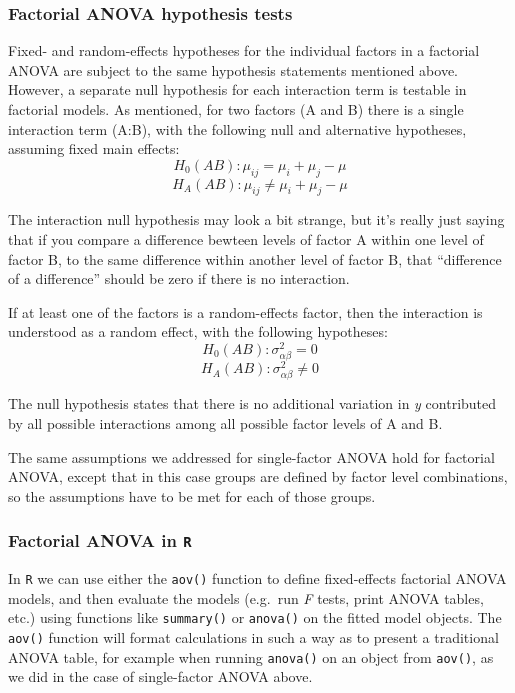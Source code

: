 \documentclass[]{book}
\begin{document}
\hypertarget{factorial-anova-hypothesis-tests}{%
\subsubsection{Factorial ANOVA hypothesis tests}\label{factorial-anova-hypothesis-tests}}

Fixed- and random-effects hypotheses for the individual factors in a factorial ANOVA are subject to the same hypothesis statements mentioned above. However, a separate null hypothesis for each interaction term is testable in factorial models. As mentioned, for two factors (A and B) there is a single interaction term (A:B), with the following null and alternative hypotheses, assuming fixed main effects:
\[H_0(AB):\mu_{ij}=\mu_i+\mu_j-\mu\]
\[H_A(AB):\mu_{ij}\neq\mu_i+\mu_j-\mu\]

The interaction null hypothesis may look a bit strange, but it's really just saying that if you compare a difference bewteen levels of factor A within one level of factor B, to the same difference within another level of factor B, that ``difference of a difference'' should be zero if there is no interaction.

If at least one of the factors is a random-effects factor, then the interaction is understood as a random effect, with the following hypotheses:
\[H_0(AB):\sigma_{\alpha\beta}^2=0\]
\[H_A(AB):\sigma_{\alpha\beta}^2\neq0\]

The null hypothesis states that there is no additional variation in \emph{y} contributed by all possible interactions among all possible factor levels of A and B.

The same assumptions we addressed for single-factor ANOVA hold for factorial ANOVA, except that in this case groups are defined by factor level combinations, so the assumptions have to be met for each of those groups.

\hypertarget{factorial-anova-in-r}{%
\subsubsection{\texorpdfstring{Factorial ANOVA in \texttt{R}}{Factorial ANOVA in R}}\label{factorial-anova-in-r}}

In \texttt{R} we can use either the \texttt{aov()} function to define fixed-effects factorial ANOVA models, and then evaluate the models (e.g.~run \emph{F} tests, print ANOVA tables, etc.) using functions like \texttt{summary()} or \texttt{anova()} on the fitted model objects. The \texttt{aov()} function will format calculations in such a way as to present a traditional ANOVA table, for example when running \texttt{anova()} on an object from \texttt{aov()}, as we did in the case of single-factor ANOVA above.
\end{document}

